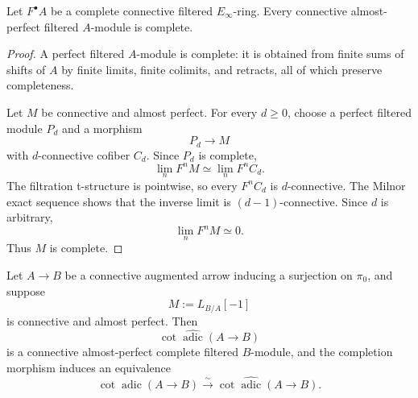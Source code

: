 \begin{lemma}
\label{lem:bnla-aperf-filtered-complete}
Let $F^\bullet A$ be a complete connective filtered $E_\infty$-ring.  Every
connective almost-perfect filtered $A$-module is complete.
\end{lemma}

\begin{proof}
A perfect filtered $A$-module is complete: it is obtained from finite sums of
shifts of $A$ by finite limits, finite colimits, and retracts, all of which
preserve completeness.

Let $M$ be connective and almost perfect.  For every $d\geq0$, choose a
perfect filtered module $P_d$ and a morphism
\[
    P_d\longrightarrow M
\]
with $d$-connective cofiber $C_d$.  Since $P_d$ is complete,
\[
    \lim_nF^nM
    \simeq
    \lim_nF^nC_d.
\]
The filtration t-structure is pointwise, so every $F^nC_d$ is
$d$-connective.  The Milnor exact sequence shows that the inverse limit is
$(d-1)$-connective.  Since $d$ is arbitrary,
\[
    \lim_nF^nM\simeq0.
\]
Thus $M$ is complete.
\end{proof}

\begin{lemma}
\label{lem:bnla-completed-adic-cotangent}
Let $A\to B$ be a connective augmented arrow inducing a surjection on
$\pi_0$, and suppose
\[
    M:=L_{B/A}[-1]
\]
is connective and almost perfect.  Then
\[
    \operatorname{cot}
    \widehat{\operatorname{adic}}(A\to B)
\]
is a connective almost-perfect complete filtered $B$-module, and the
completion morphism induces an equivalence
\[
\boxed{
    \operatorname{cot}\operatorname{adic}(A\to B)
    \xrightarrow{\sim}
    \operatorname{cot}
    \widehat{\operatorname{adic}}(A\to B).}
\]
\end{lemma}

